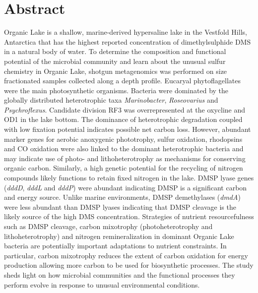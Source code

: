 \section{Abstract}
Organic Lake is a shallow, marine-derived hypersaline lake in the Vestfold Hills, Antarctica that has the highest reported concentration of dimethylsulphide \ac{DMS} in a natural body of water.
To determine the composition and functional potential of the microbial community and learn about the unusual sulfur chemistry in Organic Lake, shotgun metagenomics was performed on size fractionated samples collected along a depth profile.
Eucaryal phytoflagellates were the main photosynthetic organisms.
Bacteria were dominated by the globally distributed heterotrophic taxa \emph{Marinobacter}, \emph{Roseovarius} and \emph{Psychroflexus}.
Candidate division RF3 was overrepresented at the oxycline and OD1 in the lake bottom.
The dominance of heterotrophic degradation coupled with low fixation potential indicates possible net carbon loss.
However, abundant marker genes for aerobic anoxygenic phototrophy, sulfur oxidation, rhodopsins and CO oxidation were also linked to the dominant heterotrophic bacteria and may indicate use of photo- and lithoheterotrophy as mechanisms for conserving organic carbon.
Similarly, a high genetic potential for the recycling of nitrogen compounds likely functions to retain fixed nitrogen in the lake.
\ac{DMSP} lyase genes (\emph{dddD}, \emph{dddL} and \emph{dddP}) were abundant indicating \ac{DMSP} is a significant carbon and energy source.
Unlike marine environments, \ac{DMSP} demethylases (\emph{dmdA}) were less abundant than \ac{DMSP} lyases indicating that \ac{DMSP} cleavage is the likely source of the high \ac{DMS} concentration.
Strategies of nutrient resourcefulness such as \ac{DMSP} cleavage, carbon mixotrophy (photoheterotrophy and lithoheterotrophy) and nitrogen remineralization in dominant Organic Lake bacteria are potentially important adaptations to nutrient constraints.
In particular, carbon mixotrophy reduces the extent of carbon oxidation for energy production allowing more carbon to be used for biosynthetic processes.
The study sheds light on how microbial communities and the functional processes they perform evolve in response to unusual environmental conditions.

\newpage

\acresetall
